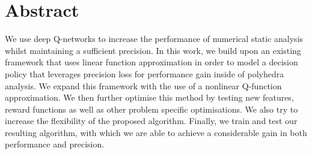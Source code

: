 
\chapter*{Abstract}
We use deep Q-networks to increase the performance of numerical static analysis whilst maintaining a sufficient precision. In this work, we build upon an existing framework that uses linear function approximation in order to model a decision policy that leverages precision loss for performance gain inside of polyhedra analysis. We expand this framework with the use of a nonlinear Q-function approximation. We then further optimise this method by testing new features, reward functions as well as other problem specific optimisations. We also try to increase the flexibility of the proposed algorithm. Finally, we train and test our resulting algorithm, with which we are able to achieve a considerable gain in both performance and precision.

